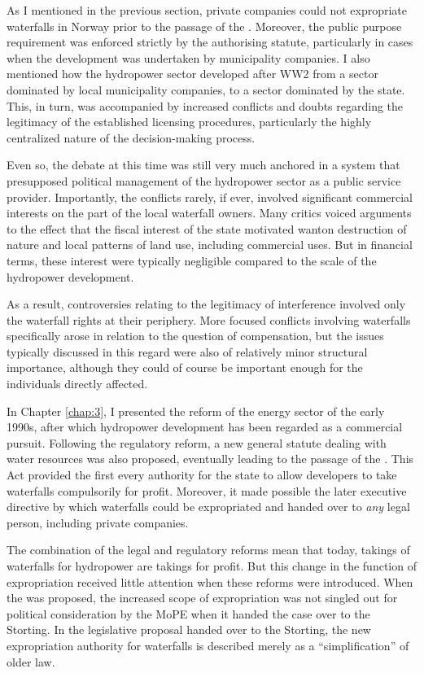 As I mentioned in the previous section, private companies could not expropriate waterfalls in Norway prior to the passage of the \cite{wra00}. Moreover, the public purpose requirement was enforced strictly by the authorising statute, particularly in cases when the development was undertaken by municipality companies. I also mentioned how the hydropower sector developed after WW2 from a sector dominated by local municipality companies, to a sector dominated by the state. This, in turn, was accompanied by increased conflicts and doubts regarding the legitimacy of the established licensing procedures, particularly the highly centralized nature of the decision-making process. 

Even so, the debate at this time was still very much anchored in a system that presupposed political management of the hydropower sector as a public service provider. Importantly, the conflicts rarely, if ever, involved significant commercial interests on the part of the local waterfall owners. Many critics voiced arguments to the effect that the fiscal interest of the state motivated wanton destruction of nature and local patterns of land use, including commercial uses. But in financial terms, these interest were typically negligible compared to the scale of the hydropower development. 

As a result, controversies relating to the legitimacy of interference involved only the waterfall rights at their periphery. More focused conflicts involving waterfalls specifically arose in relation to the question of compensation, but the issues typically discussed in this regard were also of relatively minor structural importance, although they could of course be important enough for the individuals directly affected.

In Chapter \ref{chap:3}, I presented the reform of the energy sector of the early 1990s, after which hydropower development has been regarded as a commercial pursuit. Following the regulatory reform, a new general statute dealing with water resources was also proposed, eventually leading to the passage of the \cite{wra00}. This Act provided the first every authority for the state to allow developers to take waterfalls compulsorily for profit. Moreover, it made possible the later executive directive by which waterfalls could be expropriated and handed over to {\it any} legal person, including private companies.

The combination of the legal and regulatory reforms mean that today, takings of waterfalls for hydropower are takings for profit. But this change in the function of expropriation received little attention when these reforms were introduced. When the \cite{wra00} was proposed, the increased scope of expropriation was not singled out for political consideration by the MoPE when it handed the case over to the Storting. In the legislative proposal handed over to the Storting, the new expropriation authority for waterfalls is described merely as a ``simplification'' of older law. 

